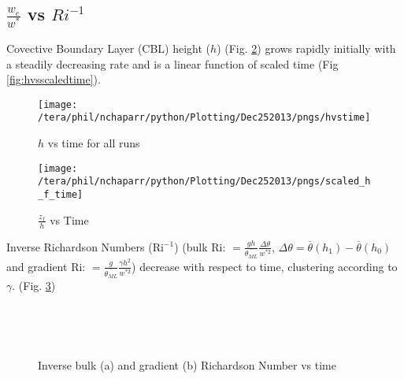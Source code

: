 \subsection{$\frac{w_{e}}{w^{*}}$ vs $Ri^{-1}$}
\FloatBarrier
Covective Boundary Layer (CBL) height ($h$) (Fig. \ref{fig:hvstime}) grows rapidly initially with a steadily decreasing rate
and is a linear function of scaled time (Fig \ref{fig:hvsscaledtime}).\\
  
\begin{figure}[htbp]
    \centering
    \texttt{[image: /tera/phil/nchaparr/python/Plotting/Dec252013/pngs/hvstime]}
    \caption{$h$ vs time for all runs}
    \label{fig:hvstime}   %
\end{figure}


\begin{figure}[htbp]
    \centering
    \texttt{[image: /tera/phil/nchaparr/python/Plotting/Dec252013/pngs/scaled\_h\_f\_time]}
    \caption{$\frac{z_{f}}{h}$ vs Time}
    \label{fig:hvstime}   %
\end{figure}





Inverse Richardson Numbers (\acs{Ri}$^{-1}$) (bulk \acs{Ri}: $=\frac{gh}{\overline{\theta_{ML}}} \frac{\Delta \theta}{w^{*2}}$, $\Delta \theta = \overline{\theta}(h_{1})-\overline{\theta}(h_{0})$ 
and gradient \acs{Ri}: $=\frac{g}{\overline{\theta_{ML}}} \frac{\gamma h^{2} }{w^{*2}}$) decrease with respect to time, 
clustering according to $\gamma$. (Fig. \ref{fig:invristime})\\

\begin{figure}[htbp]

\begin{minipage}[b]{0.5\linewidth}
         
        \\
        \end{minipage}             
\quad
\begin{minipage}[b]{0.5\linewidth}
        \\
       
       \end{minipage}
        \caption{Inverse bulk (a)  and gradient (b) Richardson Number vs time}
        \label{fig:invristime}
\end{figure}

